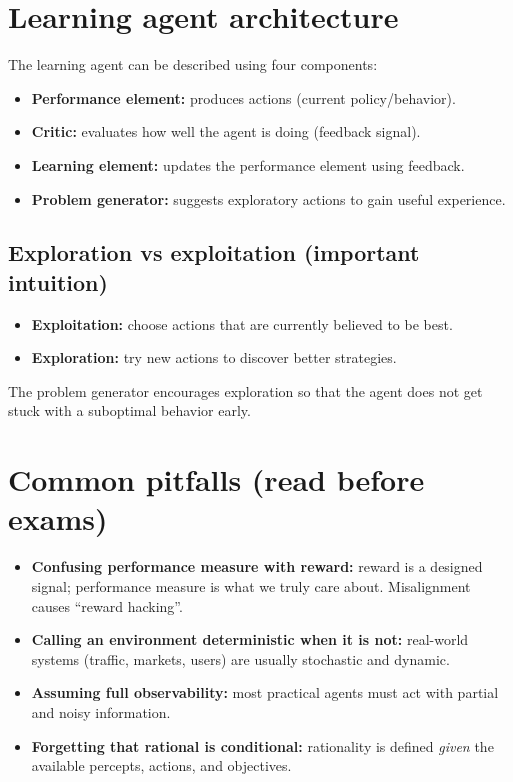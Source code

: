 \documentclass[11pt]{article}
\begin{document}
\section{Learning agent architecture}
The learning agent can be described using four components:
\begin{itemize}[leftmargin=*]
  \item \textbf{Performance element:} produces actions (current policy/behavior).
  \item \textbf{Critic:} evaluates how well the agent is doing (feedback signal).
  \item \textbf{Learning element:} updates the performance element using feedback.
  \item \textbf{Problem generator:} suggests exploratory actions to gain useful experience.
\end{itemize}

\subsection{Exploration vs exploitation (important intuition)}
\begin{itemize}[leftmargin=*]
  \item \textbf{Exploitation:} choose actions that are currently believed to be best.
  \item \textbf{Exploration:} try new actions to discover better strategies.
\end{itemize}
The problem generator encourages exploration so that the agent does not get stuck with a suboptimal behavior early.

\section{Common pitfalls (read before exams)}
\begin{itemize}[leftmargin=*]
  \item \textbf{Confusing performance measure with reward:} reward is a designed signal; performance measure is what we truly care about. Misalignment causes ``reward hacking''.
  \item \textbf{Calling an environment deterministic when it is not:} real-world systems (traffic, markets, users) are usually stochastic and dynamic.
  \item \textbf{Assuming full observability:} most practical agents must act with partial and noisy information.
  \item \textbf{Forgetting that rational is conditional:} rationality is defined \emph{given} the available percepts, actions, and objectives.
\end{itemize}
\end{document}
